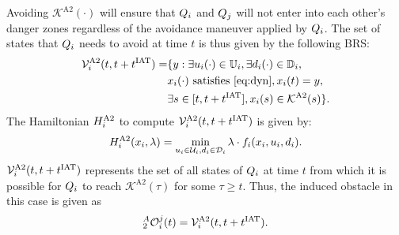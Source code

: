 \begin{itemize}[leftmargin=*]
Avoiding $\mathcal{K}^{\text{A2}}(\cdot)$ will ensure that $Q_i$ and $Q_j$ will not enter into each other's danger zones regardless of the avoidance maneuver applied by $Q_i$. The set of states that $Q_i$ needs to avoid at time $t$ is thus given by the following BRS: 
\begin{equation} \label{eq:ObsBRS_case2_caseA}
\begin{aligned}
\brs^{\text{A2}}_{i}(t, t+\iat) = & \{y: \exists \ctrl_i(\cdot) \in \cfset_i, \exists \dstb_i(\cdot) \in \dfset_i, \\
& \state_i(\cdot) \text{ satisfies \eqref{eq:dyn}}, \state_i(t) = y, \\
& \exists s \in [t, t+\iat], \state_i(s) \in \mathcal{K}^{\text{A2}}(s) \}.
\end{aligned}
\end{equation}
The Hamiltonian $H^{\text{A2}}_{i}$ to compute $\mathcal{V}^{\text{A2}}_{i}(t, t+t^\text{IAT})$ is given by:
\begin{equation} \label{eqn:BRS_obsham_case2_caseA}
\ham^{\text{A2}}_{i}(\state_i, \costate) = \min_{\ctrl_i \in \cset_i, \dstb_i \in \dset_i} \costate \cdot f_i (\state_i, \ctrl_i, \dstb_i).
\end{equation}
$\mathcal{V}^{\text{A2}}_{i}(t, t+t^\text{IAT})$ represents the set of all states of $Q_i$ at time $t$ from which it is possible for $Q_i$ to reach $\mathcal{K}^{\text{A2}}(\tau)$ for some $\tau \geq t$. Thus, the induced obstacle in this case is given as
\begin{equation} \label{eq:intruderObs_case2_caseA}
_2^A\ioset_i^j(t) = \brs^{\text{A2}}_{i}(t, t+\iat).
\end{equation}


\end{itemize}
